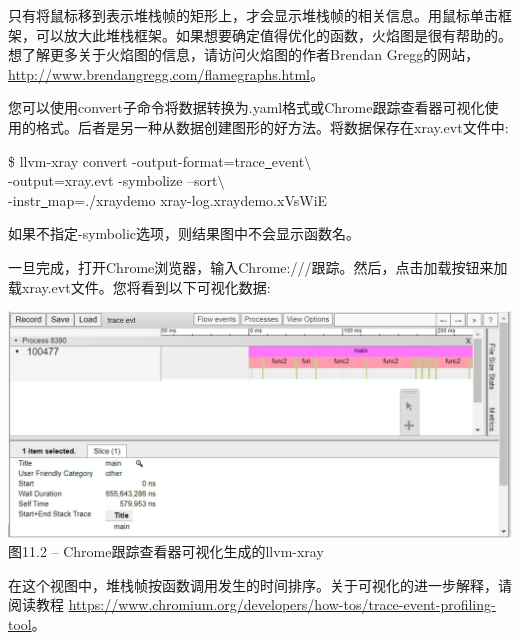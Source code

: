 只有将鼠标移到表示堆栈帧的矩形上，才会显示堆栈帧的相关信息。用鼠标单击框架，可以放大此堆栈框架。如果想要确定值得优化的函数，火焰图是很有帮助的。想了解更多关于火焰图的信息，请访问火焰图的作者Brendan Gregg的网站，\url{http://www.brendangregg.com/flamegraphs.html}。\par

您可以使用convert子命令将数据转换为.yaml格式或Chrome跟踪查看器可视化使用的格式。后者是另一种从数据创建图形的好方法。将数据保存在xray.evt文件中:\par

\begin{tcolorbox}[colback=white,colframe=black]
\$ llvm-xray convert -output-format=trace\underline{~}event$\setminus$ \\
\hspace*{0.5cm}-output=xray.evt -symbolize –sort$\setminus$ \\
\hspace*{0.5cm}-instr\underline{~}map=./xraydemo xray-log.xraydemo.xVsWiE
\end{tcolorbox}

如果不指定-symbolic选项，则结果图中不会显示函数名。\par

一旦完成，打开Chrome浏览器，输入Chrome:///跟踪。然后，点击加载按钮来加载xray.evt文件。您将看到以下可视化数据:\par

\hspace*{\fill} \par %
\begin{center}
\includegraphics[width=1\textwidth]{content/3/chapter11/images/2.jpg}\\
图11.2 – Chrome跟踪查看器可视化生成的llvm-xray
\end{center}

在这个视图中，堆栈帧按函数调用发生的时间排序。关于可视化的进一步解释，请阅读教程 \url{https://www.chromium.org/developers/how-tos/trace-event-profiling-tool}。

